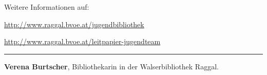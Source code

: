 \documentclass[a4paper,
fontsize=11pt,
oneside,
numbers=noperiodatend,
parskip=half-,
bibliography=totoc,
final
]{scrartcl}
\begin{document}
Weitere Informationen auf:

\url{http://www.raggal.bvoe.at/jugendbibliothek}

\url{http://www.raggal.bvoe.at/leitpapier-jugendteam}

\begin{center}\rule{0.5\linewidth}{\linethickness}\end{center}

\textbf{Verena Burtscher}, Bibliothekarin in der Walserbibliothek
Raggal.
\end{document}

